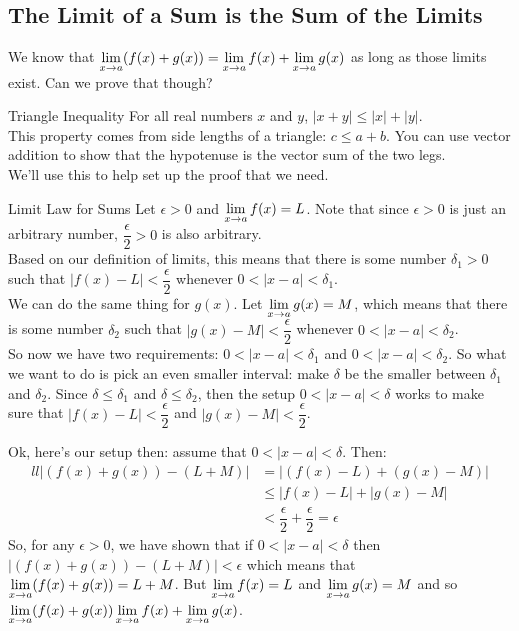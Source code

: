 \subsection{The Limit of a Sum is the Sum of the Limits}

We know that $\displaystyle \lim_{x\to a} (f(x)+g(x)) = \displaystyle \lim_{x\to a}f(x)+\displaystyle \lim_{x\to a} g(x)$ as long as those limits exist. Can we prove that though?

\begin{defn}{Triangle Inequality}
For all real numbers $x$ and $y$, $|x+y|\leq|x|+|y|$.\\

This property comes from side lengths of a triangle: $c\leq a+b$. You can use vector addition to show that the hypotenuse is the vector sum of the two legs.\\

We'll use this to help set up the proof that we need.
\end{defn}

\begin{prf}{Limit Law for Sums}
Let $\epsilon>0$ and $\displaystyle \lim_{x\to a}f(x)=L$. Note that since $\epsilon>0$ is just an arbitrary number, $\dfrac{\epsilon}{2}>0$ is also arbitrary.\\

Based on our definition of limits, this means that there is some number $\delta_1>0$ such that $|f(x)-L|<\dfrac{\epsilon}{2}$ whenever $0<|x-a|<\delta_1$.\\

We can do the same thing for $g(x)$. Let $\displaystyle \lim_{x\to a}g(x)=M$, which means that there is some number $\delta_2$ such that $|g(x)-M|<\dfrac{\epsilon}{2}$ whenever $0<|x-a|<\delta_2$.\\

So now we have two requirements: $0<|x-a|<\delta_1$ and $0<|x-a|<\delta_2$. So what we want to do is pick an even smaller interval: make $\delta$ be the smaller between $\delta_1$ and $\delta_2$. Since $\delta\leq\delta_1$ and $\delta\leq\delta_2$, then the setup $0<|x-a|<\delta$ works to make sure that $|f(x)-L|<\dfrac{\epsilon}{2}$ and $|g(x)-M|<\dfrac{\epsilon}{2}$.

Ok, here's our setup then: assume that $0<|x-a|<\delta$. Then:\\

\begin{align*}{ll}
  |\left(f(x)+g(x)\right) - (L+M)| & = |(f(x)-L)+(g(x)-M)|\\
  & \leq |f(x)-L| + |g(x)-M|\\
  &< \dfrac{\epsilon}{2}+\dfrac{\epsilon}{2} = \epsilon
\end{align*}
So, for any $\epsilon>0$, we have shown that if $0<|x-a|<\delta$ then $|(f(x)+g(x))-(L+M)|<\epsilon$ which means that $\displaystyle \lim_{x\to a}(f(x)+g(x))=L+M$. But $\displaystyle \lim_{x\to a}f(x)=L$ and $\displaystyle \lim_{x\to a}g(x)=M$ and so $\displaystyle \lim_{x\to a}(f(x)+g(x)) \displaystyle \lim_{x\to a}f(x)+\displaystyle \lim_{x\to a}g(x)$.
\end{prf}

